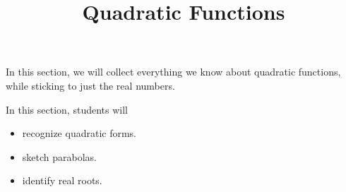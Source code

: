 \documentclass{ximera}
\title{Quadratic Functions}
\begin{document}
\begin{abstract}
\end{abstract}
\maketitle





In this section, we will collect everything we know about quadratic functions, while sticking to just the real numbers.


















\begin{sectionOutcomes}
In this section, students will 

\begin{itemize}
\item recognize quadratic forms.
\item sketch parabolas.
\item identify real roots.
\end{itemize}
\end{sectionOutcomes}
\end{document}
